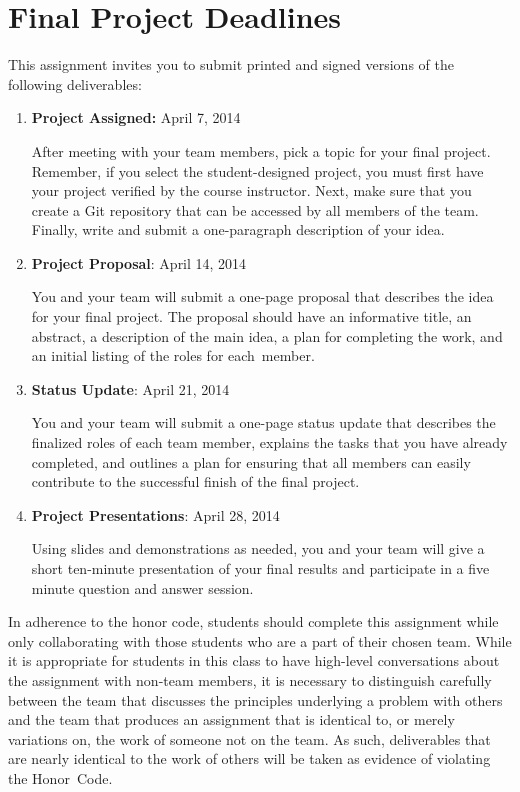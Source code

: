 \section*{Final Project Deadlines}

This assignment invites you to submit printed and signed versions of the following deliverables: 

\vspace*{-.05in}
\begin{enumerate}

  \itemsep0in

  \item {\bf Project Assigned:} April 7, 2014

    After meeting with your team members, pick a topic for your final project.  Remember, if you select the
    student-designed project, you must first have your project verified by the course instructor.  Next, make sure that
    you create a Git repository that can be accessed by all members of the team. Finally, write and submit a
    one-paragraph description of your idea.

  \item {\bf Project Proposal}: April 14, 2014

    You and your team will submit a one-page proposal that describes the idea for your final project.  The proposal
    should have an informative title, an abstract, a description of the main idea, a plan for completing the work, and
    an initial listing of the roles for \mbox{each member}. 

  \item {\bf Status Update}: April 21, 2014

    You and your team will submit a one-page status update that describes the finalized roles of each team member,
    explains the tasks that you have already completed, and outlines a plan for ensuring that all members can easily
    contribute to the successful finish of the final project.

  \item {\bf Project Presentations}: April 28, 2014

    Using slides and demonstrations as needed, you and your team will give a short ten-minute presentation of your final
    results and participate in a five minute question and answer session.

\end{enumerate}
\vspace*{-.05in}

In adherence to the honor code, students should complete this assignment while only collaborating with those students
who are a part of their chosen team. While it is appropriate for students in this class to have high-level
conversations about the assignment with non-team members, it is necessary to distinguish carefully between the team that
discusses the principles underlying a problem with others and the team that produces an assignment that is identical to,
or merely variations on, the work of someone not on the team.  As such, deliverables that are nearly identical to the
work of others will be taken as evidence of violating the \mbox{Honor Code}.  

  
